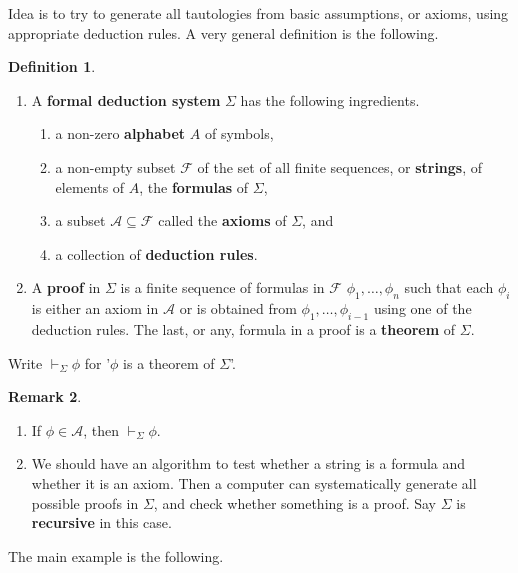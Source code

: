 \documentclass{article}
\newcommand{\A}{\mathcal{A}}
\theoremstyle{definition}\newtheorem{definition}{Definition}[subsection]
\theoremstyle{definition}\newtheorem{remark}[definition]{Remark}
\theoremstyle{definition}\newtheorem*{example}{Example}
\theoremstyle{definition}\newtheorem*{note}{Note}
\begin{document}
Idea is to try to generate all tautologies from basic assumptions, or axioms, using appropriate deduction rules. A very general definition is the following.

\begin{definition}
\hfill
\begin{enumerate}
\item A \textbf{formal deduction system} $ \Sigma $ has the following ingredients.
\begin{enumerate}
\item a non-zero \textbf{alphabet} $ A $ of symbols,
\item a non-empty subset $ \mathcal{F} $ of the set of all finite sequences, or \textbf{strings}, of elements of $ A $, the \textbf{formulas} of $ \Sigma $,
\item a subset $ \A \subseteq \mathcal{F} $ called the \textbf{axioms} of $ \Sigma $, and
\item a collection of \textbf{deduction rules}.
\end{enumerate}
\item A \textbf{proof} in $ \Sigma $ is a finite sequence of formulas in $ \mathcal{F} $ $ \phi_1, \dots, \phi_n $ such that each $ \phi_i $ is either an axiom in $ \A $ or is obtained from $ \phi_1, \dots, \phi_{i - 1} $ using one of the deduction rules. The last, or any, formula in a proof is a \textbf{theorem} of $ \Sigma $.
\end{enumerate}
Write $ \vdash_\Sigma \phi $ for '$ \phi $ is a theorem of $ \Sigma $'.
\end{definition}

\begin{remark}
\hfill
\begin{enumerate}
\item If $ \phi \in \A $, then $ \vdash_\Sigma \phi $.
\item We should have an algorithm to test whether a string is a formula and whether it is an axiom. Then a computer can systematically generate all possible proofs in $ \Sigma $, and check whether something is a proof. Say $ \Sigma $ is \textbf{recursive} in this case.
\end{enumerate}
\end{remark}

The main example is the following.
\end{document}
